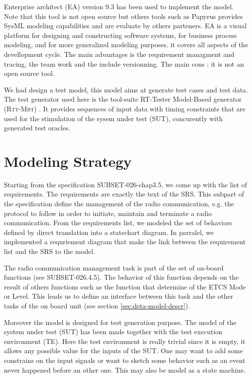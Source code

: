 \documentclass{template/openetcs_article}
\begin{document}
Enterprise architect (EA) version 9.3 \cite{EA} has been used to implement the
model. Note that this tool is not open source but others tools  such as Papyrus
\cite{papyrus} provides SysML modeling capabilities and are evaluate by others
parteners.
EA is a visual platform for designing and constructing
software systems, for business process modeling, and for more generalized
modeling purposes. it covers all aspects of the devellopment cycle. The main
advantages is the requirement managment and tracing, the team work and the
include versionning. The main cons : it is not an open source tool.

We had design a test model, this model aims at generate test cases and test
data. The test generator used here is the tool-suite RT-Tester Model-Based generator
(\textsc{Rtt-Mbt}) \cite{peleska2011,rttmbtreport2011}. It provides sequences of
input data with timing constraints that are used for the stimulation of the
sysem under test (SUT), concurently with generated test oracles. 

\section{Modeling Strategy}
\label{sec:modeling-strategy}
Starting from the specification SUBSET-026-chap3.5, we come up with the list of
requirements. The requirements are exactly the text of the SRS. 
This subpart of the specification define the management of the radio
communication, e.g. the protocol to follow in order to initiate, 
maintain  and terminate a radio communication. 
From the requirements list, we modeled the set of behaviors defined by direct translation 
into a statechart diagram. In parralel, we implemented  a requriement diagram that
make the link between the requirement list and  the SRS to the model.

The radio communication management task is part of the set of on-board functions
(see SUBSET-026.4.5). The behavior of this function depends on the result of
others functions such as the function that determine of the ETCS Mode or Level.
This leads us to define an interface between this task
and the other tasks of the on board unit (see section \ref{sec:deta-model-descr}).

Moreover the model is designed for test generation purpose. The model of the
system under test (SUT)  has been
made together with the test execution environment (TE). Here the test
environment is really trivial since it is empty, it allows any possible value
for the inputs of the SUT. One may want to add some constrains on the input
signals or want to sketch some behavior such as an event never happened before
an other one. This may also be model as a state machine.
\end{document}
